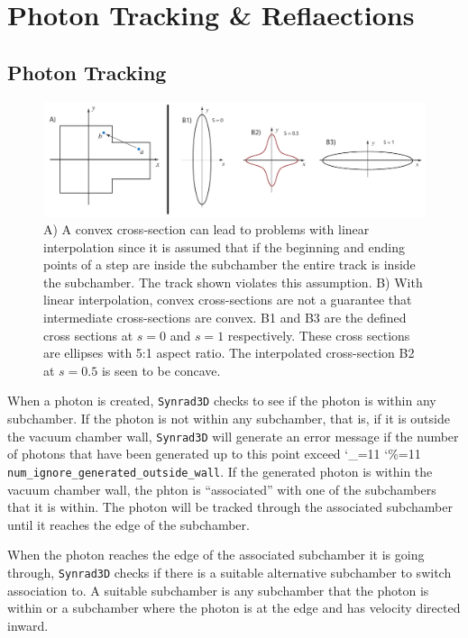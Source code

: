 \documentclass[11pt,openany]{report}
\newcommand{\srthree}{\texttt{Synrad3D}\xspace}
\newcommand\ttcmd{\begingroup\catcode`\_=11 \catcode`\%=11 \dottcmd}
\newcommand\dottcmd[1]{\texttt{#1}\endgroup}
\newcommand{\vn}{\ttcmd}
\begin{document}
\chapter{Photon Tracking \& Reflaections}

\section{Photon Tracking}
\label{s:track}

\begin{figure}[tb]
\begin{center}
\includegraphics[width=6in]{chamber-problem.pdf} \caption{A) A convex cross-section can
lead to problems with linear interpolation since it is assumed that if the beginning and
ending points of a step are inside the subchamber the entire track is inside the
subchamber. The track shown violates this assumption.  B) With linear interpolation,
convex cross-sections are not a guarantee that intermediate cross-sections are convex. B1
and B3 are the defined cross sections at $s = 0$ and $s = 1$ respectively. These cross
sections are ellipses with 5:1 aspect ratio. The interpolated cross-section B2 at $s =
0.5$ is seen to be concave.}  \label{f:convex-chamber}
\end{center}
\end{figure}

When a photon is created, \srthree checks to see if the photon is within any
subchamber. If the photon is not within any subchamber, that is, if it is outside the
vacuum chamber wall, \srthree will generate an error message if the number of photons that
have been generated up to this point exceed \vn{num_ignore_generated_outside_wall}. If
the generated photon is within the vacuum chamber wall, the phton is ``associated'' with
one of the subchambers that it is within.  The photon will be tracked through the
associated subchamber until it reaches the edge of the subchamber.

When the photon reaches the edge of the associated subchamber it is going through,
\srthree checks if there is a suitable alternative subchamber to switch association to. A
suitable subchamber is any subchamber that the photon is within or a subchamber where the
photon is at the edge and has velocity directed inward.
\end{document}
